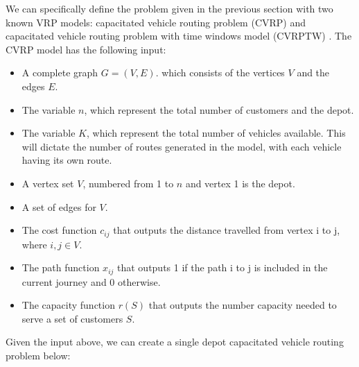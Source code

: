 We can specifically define the problem given in the previous section with two known VRP models: capacitated
vehicle routing problem (CVRP) \cite{Daneshzand2011} and capacitated vehicle routing problem
with time windows model (CVRPTW) \cite{Daneshzand2011, Desrochers1988}. The CVRP model has the following input:
\begin{itemize}
\item A complete graph \(G = (V, E)\). which consists of the vertices \(V\) and the edges \(E\).
\item The variable \(n\), which represent the total number of customers and the depot.
\item The variable \(K\), which represent the total number of vehicles available. This will dictate the number of routes
generated in the model, with each vehicle having its own route.
\item A vertex set \(V\), numbered from 1 to \(n\) and vertex 1 is the depot.
\item A set of edges for \(V\).
\item The cost function \(c_{ij}\) that outputs the distance travelled from vertex i to j, where \(i,j \in V\).
\item The path function \(x_{ij}\) that outputs 1 if the path i to j is included in the current journey and 0 otherwise.
\item The capacity function \(r(S)\) that outputs the number capacity needed to serve a set of customers \(S\).
\end{itemize}

Given the input above, we can create a single depot capacitated vehicle routing problem below:

\vspace{0.5cm}

